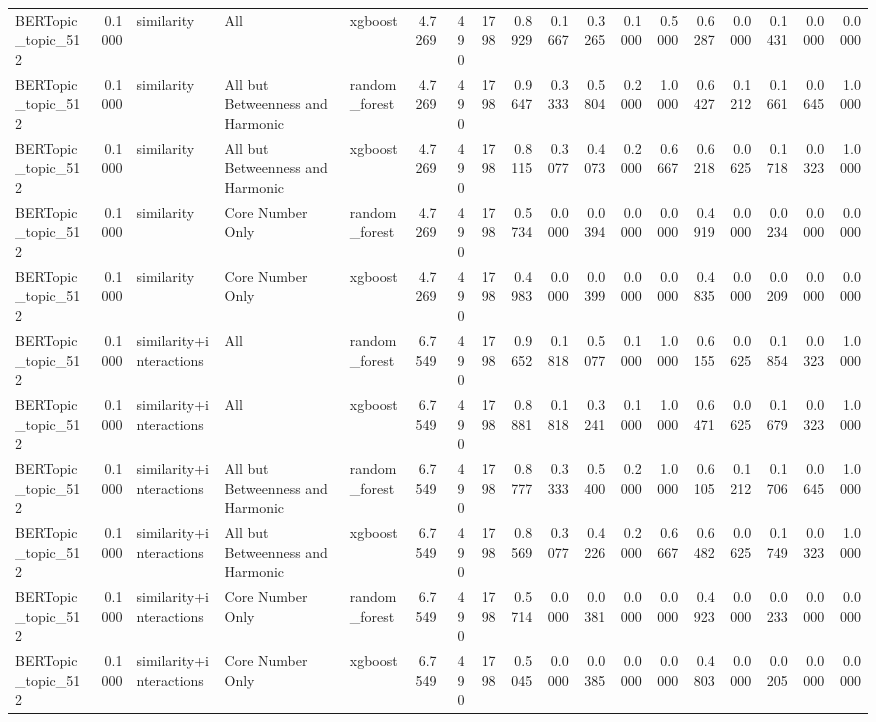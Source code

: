 \begin{tabular}{lrlllrrrrrrrrrrrrr}
BERTopic_topic_512 & 0.1000 & similarity & All & xgboost & 4.7269 & 490 & 1798 & 0.8929 & 0.1667 & 0.3265 & 0.1000 & 0.5000 & 0.6287 & 0.0000 & 0.1431 & 0.0000 & 0.0000 \\
BERTopic_topic_512 & 0.1000 & similarity & All but Betweenness and Harmonic & random_forest & 4.7269 & 490 & 1798 & 0.9647 & 0.3333 & 0.5804 & 0.2000 & 1.0000 & 0.6427 & 0.1212 & 0.1661 & 0.0645 & 1.0000 \\
BERTopic_topic_512 & 0.1000 & similarity & All but Betweenness and Harmonic & xgboost & 4.7269 & 490 & 1798 & 0.8115 & 0.3077 & 0.4073 & 0.2000 & 0.6667 & 0.6218 & 0.0625 & 0.1718 & 0.0323 & 1.0000 \\
BERTopic_topic_512 & 0.1000 & similarity & Core Number Only & random_forest & 4.7269 & 490 & 1798 & 0.5734 & 0.0000 & 0.0394 & 0.0000 & 0.0000 & 0.4919 & 0.0000 & 0.0234 & 0.0000 & 0.0000 \\
BERTopic_topic_512 & 0.1000 & similarity & Core Number Only & xgboost & 4.7269 & 490 & 1798 & 0.4983 & 0.0000 & 0.0399 & 0.0000 & 0.0000 & 0.4835 & 0.0000 & 0.0209 & 0.0000 & 0.0000 \\
BERTopic_topic_512 & 0.1000 & similarity+interactions & All & random_forest & 6.7549 & 490 & 1798 & 0.9652 & 0.1818 & 0.5077 & 0.1000 & 1.0000 & 0.6155 & 0.0625 & 0.1854 & 0.0323 & 1.0000 \\
BERTopic_topic_512 & 0.1000 & similarity+interactions & All & xgboost & 6.7549 & 490 & 1798 & 0.8881 & 0.1818 & 0.3241 & 0.1000 & 1.0000 & 0.6471 & 0.0625 & 0.1679 & 0.0323 & 1.0000 \\
BERTopic_topic_512 & 0.1000 & similarity+interactions & All but Betweenness and Harmonic & random_forest & 6.7549 & 490 & 1798 & 0.8777 & 0.3333 & 0.5400 & 0.2000 & 1.0000 & 0.6105 & 0.1212 & 0.1706 & 0.0645 & 1.0000 \\
BERTopic_topic_512 & 0.1000 & similarity+interactions & All but Betweenness and Harmonic & xgboost & 6.7549 & 490 & 1798 & 0.8569 & 0.3077 & 0.4226 & 0.2000 & 0.6667 & 0.6482 & 0.0625 & 0.1749 & 0.0323 & 1.0000 \\
BERTopic_topic_512 & 0.1000 & similarity+interactions & Core Number Only & random_forest & 6.7549 & 490 & 1798 & 0.5714 & 0.0000 & 0.0381 & 0.0000 & 0.0000 & 0.4923 & 0.0000 & 0.0233 & 0.0000 & 0.0000 \\
BERTopic_topic_512 & 0.1000 & similarity+interactions & Core Number Only & xgboost & 6.7549 & 490 & 1798 & 0.5045 & 0.0000 & 0.0385 & 0.0000 & 0.0000 & 0.4803 & 0.0000 & 0.0205 & 0.0000 & 0.0000 \\

\end{tabular}
